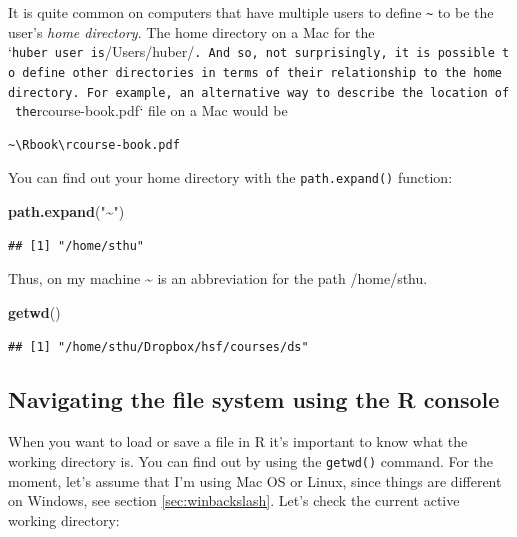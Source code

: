 \documentclass[
  12pt,
  oneside]{book}
\newenvironment{Shaded}{\begin{snugshade}}{\end{snugshade}}
\newcommand{\FunctionTok}[1]{\textcolor[rgb]{0.13,0.29,0.53}{\textbf{#1}}}
\newcommand{\NormalTok}[1]{#1}
\newcommand{\StringTok}[1]{\textcolor[rgb]{0.31,0.60,0.02}{#1}}
\begin{document}
It is quite common on computers that have multiple users to define \texttt{\textasciitilde{}} to be the user's \emph{home directory}. The home directory on a Mac for the `\texttt{huber\textquotesingle{}\textquotesingle{}\ user\ is}/Users/huber/\texttt{.\ And\ so,\ not\ surprisingly,\ it\ is\ possible\ to\ define\ other\ directories\ in\ terms\ of\ their\ relationship\ to\ the\ home\ directory.\ For\ example,\ an\ alternative\ way\ to\ describe\ the\ location\ of\ the}rcourse-book.pdf` file on a Mac would be

\begin{verbatim}
~\Rbook\rcourse-book.pdf
\end{verbatim}

You can find out your home directory with the \texttt{path.expand()} function:

\begin{Shaded}
\begin{Highlighting}[]
\FunctionTok{path.expand}\NormalTok{(}\StringTok{"\textasciitilde{}"}\NormalTok{)}
\end{Highlighting}
\end{Shaded}

\begin{verbatim}
## [1] "/home/sthu"
\end{verbatim}

Thus, on my machine \textasciitilde{} is an abbreviation for the path /home/sthu.

\begin{Shaded}
\begin{Highlighting}[]
\FunctionTok{getwd}\NormalTok{()}
\end{Highlighting}
\end{Shaded}

\begin{verbatim}
## [1] "/home/sthu/Dropbox/hsf/courses/ds"
\end{verbatim}

\hypertarget{sec:navigationR}{%
\subsection{Navigating the file system using the R console}\label{sec:navigationR}}

When you want to load or save a file in R it's important to know what the working directory is. You can find out by using the \texttt{getwd()} command. For the moment, let's assume that I'm using Mac OS or Linux, since things are different on Windows, see section \ref{sec:winbackslash}.
Let's check the current active working directory:
\end{document}

